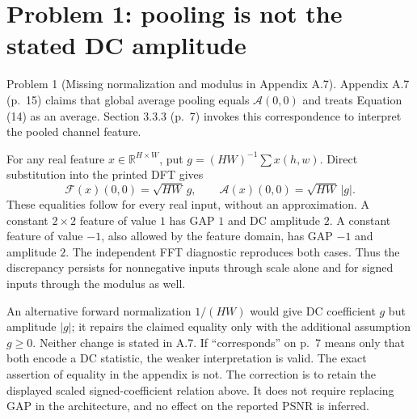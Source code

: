 \documentclass[10pt]{article}
\begin{document}
\section*{Problem 1: pooling is not the stated DC amplitude}
Problem 1 (Missing normalization and modulus in Appendix A.7).  Appendix A.7 (p. 15) claims that global average pooling equals \(\mathcal A(0,0)\) and treats Equation (14) as an average. Section 3.3.3 (p. 7) invokes this correspondence to interpret the pooled channel feature.\par
For any real feature \(x\in\mathbb R^{H\times W}\), put \(g=(HW)^{-1}\sum x(h,w)\). Direct substitution into the printed DFT gives \[\mathcal F(x)(0,0)=\sqrt{HW}\,g,
 \qquad \mathcal A(x)(0,0)=\sqrt{HW}\,|g|.\] These equalities follow for every real input, without an approximation. A constant \(2\times2\) feature of value \(1\) has GAP \(1\) and DC amplitude \(2\). A constant feature of value \(-1\), also allowed by the feature domain, has GAP \(-1\) and amplitude \(2\). The independent FFT diagnostic reproduces both cases. Thus the discrepancy persists for nonnegative inputs through scale alone and for signed inputs through the modulus as well.\par
An alternative forward normalization \(1/(HW)\) would give DC coefficient \(g\) but amplitude \(|g|\); it repairs the claimed equality only with the additional assumption \(g\geq0\). Neither change is stated in A.7. If “corresponds” on p. 7 means only that both encode a DC statistic, the weaker interpretation is valid. The exact assertion of equality in the appendix is not. The correction is to retain the displayed scaled signed-coefficient relation above. It does not require replacing GAP in the architecture, and no effect on the reported PSNR is inferred.\par
\end{document}
